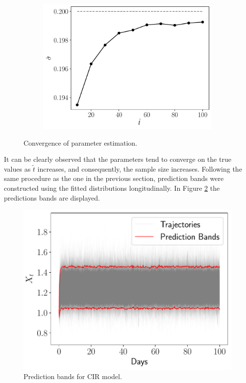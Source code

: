 \documentclass[11pt]{article}
\theoremstyle{definition}
\theoremstyle{remark}
\theoremstyle{remark}
\begin{document}
\begin{figure}[H]
\begin{subfigure}[b]{0.45\textwidth}
      \includegraphics[scale=0.45]{sigmas.pdf}
      \caption{}
  \end{subfigure}
  \caption{Convergence of parameter estimation.}
  \label{fig:conv_param}
\end{figure}

It can be clearly observed that the parameters tend to converge on the true
values as $\tilde{t}$ increases, and consequently, the sample size increases.
Following the same procedure as the one in the previous section,
prediction bands were constructed using the fitted distributions
longitudinally. In Figure \ref{fig:bands2} the predictions bands are
displayed.

\begin{figure}[H]
  \centering
  \includegraphics[scale=.5]{prediction_bands_2}
  \caption{Prediction bands for CIR model.}
  \label{fig:bands2}
\end{figure}
\end{document}
